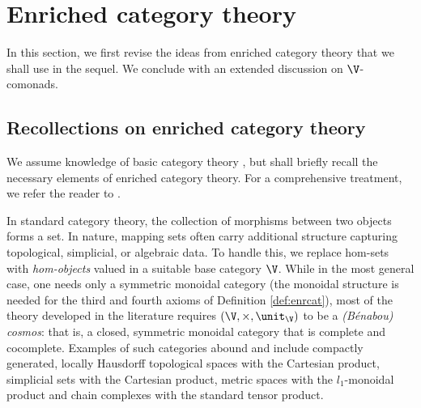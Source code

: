 \documentclass{tac}
\begin{document}
\section{Enriched category theory}
In this section, we first revise the ideas from enriched category theory that we shall use in the sequel. We conclude with an extended discussion on $\V$-comonads.
\subsection{Recollections on enriched category theory}
\label{sec:enriched_review}
We assume knowledge of basic category theory \cite{riehl16}, but shall briefly recall the necessary elements of enriched category theory. For a comprehensive treatment, we refer the reader to \cite{kelly05}.

In standard category theory, the collection of morphisms between two objects forms a set. In nature, mapping sets often carry additional structure capturing topological, simplicial, or algebraic data. To handle this, we replace hom-sets with \emph{hom-objects} valued in a suitable base category $\V$.  While in the most general case, one needs only a symmetric monoidal category (the monoidal structure is needed for the third and fourth axioms of Definition \ref{def:enrcat}), most of the theory developed in the literature requires $(\V, \times, \unit_{\V})$ to be a \emph{(Bénabou) cosmos}: that is, a closed, symmetric monoidal category that is complete and cocomplete. Examples of such categories abound and include compactly generated, locally Hausdorff topological spaces with the Cartesian product, simplicial sets with the Cartesian product, metric spaces with the $l_1$-monoidal product and chain complexes with the standard tensor product.

\medskip 
\end{document}
